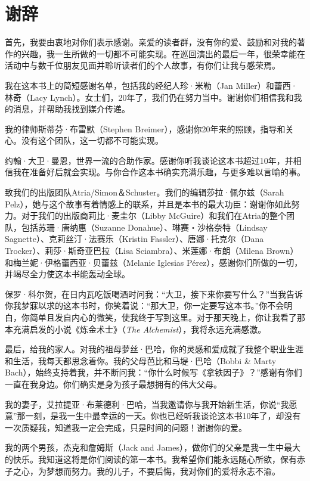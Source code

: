 \section{谢辞}

首先，我要由衷地对你们表示感谢。亲爱的读者群，没有你的爱、鼓励和对我的著作的兴趣，我一生所做的一切都不可能实现。在巡回演出的最后一年，很荣幸能在活动中与数千位朋友见面并聆听读者们的个人故事，有你们让我与感荣焉。

我在这本书上的简短感谢名单，包括我的经纪人珍·米勒（Jan Miller）和蕾西·林奇（Lacy Lynch）。女士们，20年了，我们仍在努力当中。谢谢你们相信我和我的消息，并帮助我找到媒介传递。

我的律师斯蒂芬·布雷默（Stephen Breimer），感谢你20年来的照顾，指导和关心。没有这个团队，这一切都不可能实现。

约翰·大卫·曼恩，世界一流的合助作家。感谢你听我谈论这本书超过10年，并相信我在准备好后就会实现。与你合作这本书确实充满乐趣，与更多难以言喻的事。

致我们的出版团队Atria/Simon＆Schuster。我们的编辑莎拉·佩尔兹（Sarah Pelz），她与这个故事有着情感上的联系，并且是本书的最大功臣：谢谢你如此努力。对于我们的出版商莉比·麦圭尔（Libby McGuire）和我们在Atria的整个团队，包括苏珊·唐纳惠（Suzanne Donahue）、琳赛‧沙格奈特（Lindsay Sagnette）、克莉丝汀·法赛乐（Kristin Fassler）、唐娜·托克尔（Dana Trocker）、莉莎·斯奇亚巴拉（Lisa Sciambra）、米莲娜·布朗（Milena Brown）和梅兰妮·伊格蕾西亚·贝蕾兹（Melanie Iglesias Pérez），感谢你们所做的一切，并竭尽全力使这本书能轰动全球。

保罗·科尔贺，在日内瓦吃饭喝酒时问我：“大卫，接下来你要写什么？”当我告诉你我梦寐以求的这本书时，你笑着说：“那大卫，你一定要写这本书。”你不会明白，你简单且发自内心的微笑，使我终于写到这里。对于那天晚上，你让我看了那本充满启发的小说《炼金术士》（\textit{The Alchemist}），我将永远充满感激。

最后，给我的家人。对我的祖母萝丝·巴哈，你的灵感和爱成就了我整个职业生涯和生活，我每天都思念着你。我的父母芭比和马堤·巴哈（Bobbi \& Marty Bach），始终支持着我，并不断问我：“你什么时候写《拿铁因子》？”感谢有你们一直在我身边。你们确实是身为孩子最想拥有的伟大父母。

我的妻子，艾拉提亚·布莱德利·巴哈，当我邀请你与我开始新生活，你说“我愿意”那一刻，是我一生中最幸运的一天。你也已经听我谈论这本书10年了，却没有一次质疑我，知道我一定会完成，只是时间的问题！谢谢你的爱。

我的两个男孩，杰克和詹姆斯（Jack and James），做你们的父亲是我一生中最大的快乐。我知道这将是你们阅读的第一本书。我希望你们能永远随心所欲，保有赤子之心，为梦想而努力。我的儿子，不要后悔，我对你们的爱将永志不渝。
